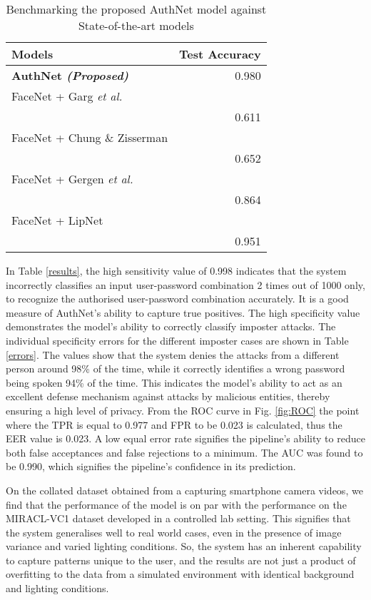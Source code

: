 \documentclass[letterpaper]{article}
\begin{document}
\begin{table}[h!]
\centering
\caption{Benchmarking the proposed AuthNet model against State-of-the-art models}
\renewcommand{\arraystretch}{1.2}
\begin{tabular}{l r}
\hline
\textbf{Models}                            & \textbf{Test Accuracy} \\ \hline

\textbf{AuthNet \textit{(Proposed)}}           & 0.980            \\ FaceNet + Garg \textit{et al.} \\ \cite{stanford}         & 0.611            \\ FaceNet + Chung \& Zisserman \\ \cite{Chung} & 0.652            \\ FaceNet + Gergen \textit{et al.} \\ \cite{gergen2016dynamic}           & 0.864            \\ FaceNet + LipNet \\ \cite{liplstm}                & 0.951           \\ \hline
\end{tabular}
\label{SOTA}
\end{table}
\vspace{-0.2em}
In Table \ref{results}, the high sensitivity value of 0.998 indicates that the system incorrectly classifies an input user-password combination 2 times out of 1000 only, to recognize the authorised user-password combination accurately. It is a good measure of AuthNet's ability to capture true positives. The high specificity value demonstrates the model's ability to correctly classify imposter attacks. The individual specificity errors for the different imposter cases are shown in Table \ref{errors}. The values show that the system denies the attacks from a different person around 98\% of the time, while it correctly identifies a wrong password being spoken 94\% of the time. This indicates the model's ability to act as an excellent defense mechanism against attacks by malicious entities, thereby ensuring a high level of privacy. From the ROC curve in Fig. \ref{fig:ROC} the point where the TPR is equal to 0.977 and FPR to be 0.023 is calculated, thus the EER value is 0.023. A low equal error rate signifies the pipeline's ability to reduce both false acceptances and false rejections to a minimum. The AUC was found to be 0.990, which signifies the pipeline's confidence in its prediction. 

On the collated dataset obtained from a capturing smartphone camera videos, we find that the performance of the model is on par with the performance on the MIRACL-VC1 dataset developed in a controlled lab setting. This signifies that the system generalises well to real world cases, even in the presence of image variance and varied lighting conditions. So, the system has an inherent capability to capture patterns unique to the user, and the results are not just a product of overfitting to the data from a simulated environment with identical background and lighting conditions.
\end{document}
